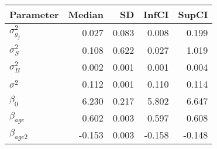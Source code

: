 \begin{table}[ht]
\centering
\begin{tabular}{lrrrr}
  \hline
Parameter & Median & SD & InfCI & SupCI \\ 
  \hline
$\sigma^{2}_{g_{j}}$ & 0.027 & 0.083 & 0.008 & 0.199 \\ 
  $\sigma^{2}_{S}$ & 0.108 & 0.622 & 0.027 & 1.019 \\ 
  $\sigma^{2}_{B}$ & 0.002 & 0.001 & 0.001 & 0.004 \\ 
  $\sigma^{2}$ & 0.112 & 0.001 & 0.110 & 0.114 \\ 
  $\beta_{0}$ & 6.230 & 0.217 & 5.802 & 6.647 \\ 
  $\beta_{age}$ & 0.602 & 0.003 & 0.597 & 0.608 \\ 
  $\beta_{age2}$ & -0.153 & 0.003 & -0.158 & -0.148 \\ 
   \hline
\end{tabular}
\end{table}
